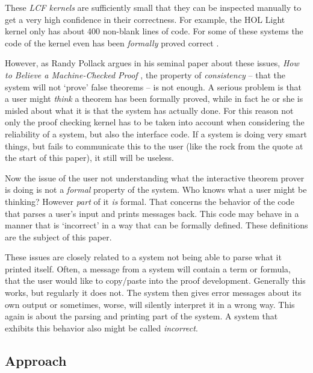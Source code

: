 \documentclass{entcs}
\begin{document}
These \emph{{\small LCF} kernels} are sufficiently small that they
can be inspected manually to get a very high confidence in their correctness.
For example, the {\small HOL} Light kernel only has about 400 non-blank lines
of code.
For some of these systems the {code} of the kernel
even has been \emph{formally} proved correct
\cite{bar:96,bar:99:1,har:06}.

However,
as Randy Pollack argues in his seminal paper about these issues,
\emph{How to Believe a Machine-Checked Proof} \cite{pol:98},
the property of \emph{consistency} -- that the system will
not `prove' false theorems -- is not enough.
A serious problem is that a user might \emph{think} a theorem
has been formally proved, while in fact he or she is misled about
what it is that the system has actually done.
For this reason not only the proof checking kernel
has to be taken into account when considering the reliability of a system,
but also the interface code.
If a system is doing very smart things, but fails to communicate
this to the user (like the rock from the quote at the start of this paper),
it still will be useless.

Now the issue of the user not understanding what the interactive theorem prover
is doing is not a \emph{formal} property of the system.
Who knows what a user might be thinking?
However \emph{part} of it \emph{is} formal.
That concerns the behavior of
the code that parses a user's input and prints messages back.
This code may behave in a manner that is `incorrect' in a way that can
be formally defined.
These definitions are the subject of this paper.

These issues are closely related to a system not being able to parse
what it printed itself.
Often, a message from a system will contain a term or formula, that the
user would like to copy/paste into the proof development.
Generally this works, but regularly it does not.
The system then gives error messages about its own output or sometimes,
worse, will silently interpret it in a wrong way.
This again is about the parsing and printing
part of the system.
A system that exhibits this behavior also might be called \emph{incorrect}.

\subsection{Approach}
\end{document}
